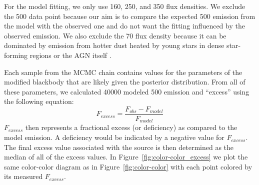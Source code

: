 For the model fitting, we only use 160, 250, and 350 \um{} flux densities. We exclude the 500 \um{} data point because our aim is to compare the expected 500 \um{} emission from the model with the observed one and do not want the fitting influenced by the observed emission. We also exclude the 70 \um{} flux density because it can be dominated by emission from hotter dust heated by young stars in dense star-forming regions or the AGN itself \citep{Calzetti:2000fk,Bendo:2010kq,Boquien:2011qf,Smith:2012fj,Melendez:2014yu}.

Each sample from the MCMC chain contains values for the parameters of the modified blackbody that are likely given the posterior distribution. From all of these parameters, we calculated 40000 modeled 500 \um{} emission and ``excess'' using the following equation:
\begin{equation}\label{eq:500um_excess}
F_{excess} = \frac{F_{obs} - F_{model}}{F_{model}}
\end{equation}
\noindent $F_{excess}$ then represents a fractional excess (or deficiency) as compared to the model emission. A deficiency would be indicated by a negative value for $F_{excess}$. The final excess value associated with the source is then determined as the median of all of the excess values. In Figure~\ref{fig:color-color_excess} we plot the same color-color diagram as in Figure~\ref{fig:color-color} with each point colored by its measured $F_{excess}$.



  
  
  
  
  
  
  
  